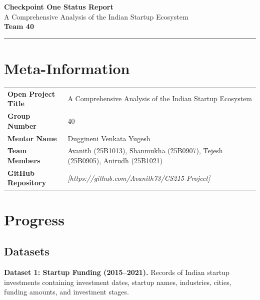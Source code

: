 \documentclass[10pt,a4paper]{article}
\begin{document}

\begin{center}
    {\LARGE\bfseries Checkpoint One Status Report}\\[5pt]
    {\large A Comprehensive Analysis of the Indian Startup Ecosystem}\\[8pt]
    {\normalsize\textbf{Team 40}}
\end{center}

\vspace{3pt}
\hrule
\vspace{5pt}


\section{Meta-Information}

\begin{tabularx}{\textwidth}{@{}>{\bfseries}p{3.7cm}X@{}}
Open Project Title &
A Comprehensive Analysis of the Indian Startup Ecosystem \\

Group Number & 40 \\

Mentor Name & Duggineni Venkata Yugesh \\

Team Members &
Avanith (25B1013), Shanmukha (25B0907),
Tejesh (25B0905), Anirudh (25B1021) \\

GitHub Repository &
\textit{[https://github.com/Avanith73/CS215-Project]} \\
\end{tabularx}

\section{Progress}

\subsection{Datasets}

\textbf{Dataset 1: Startup Funding (2015--2021).}
Records of Indian startup investments containing investment dates,
startup names, industries, cities, funding amounts, and investment
stages.
\end{document}
